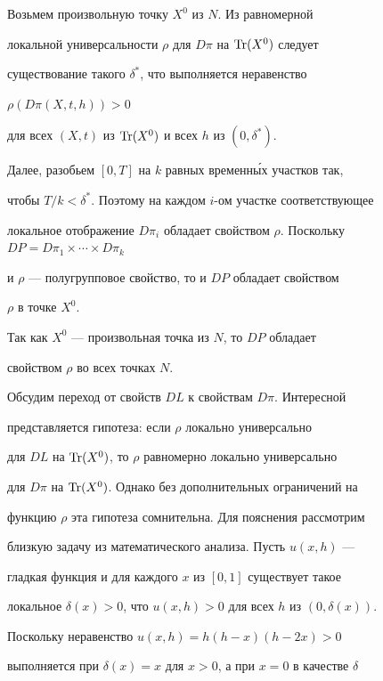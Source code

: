 \begin{pf} 


Возьмем произвольную точку $X^0$ из $N$. Из равномерной 


локальной универсальности $\rho$ для $D\pi$ на $\operatorname{Tr}(X^0)$ следует 


существование такого $\delta^*$, что выполняется неравенство 


$\rho(D\pi(X,t,h))>0$ 


для всех $(X,t)$ из $\operatorname{Tr}(X^0)$ и всех $h$ из $(0,\delta^*)$. 


 


Далее, разобьем $[0,T]$ на $k$ равных временн\'ых участков так, 


чтобы $T/k<\delta^*$. Поэтому на каждом $i$-ом участке соответствующее 


локальное отображение $D\pi_i$ обладает свойством $\rho$. Поскольку $D 


P=D\pi_1\times\dotsb\times D\pi_k$ 


и $\rho$ --- полугрупповое свойство, то и $D P$ обладает свойством 


$\rho$ в точке $X^0$. 


Так как $X^0$ --- произвольная точка из $N$, то $D P$ обладает 


свойством $\rho$ во всех точках $N$. 


\end{pf} 


 


Обсудим переход от свойств $D L$ к свойствам $D\pi$. Интересной 


представляется гипотеза: если $\rho$ локально универсально 


для $D L$ на $\operatorname{Tr}(X^0)$, то $\rho$ равномерно локально универсально 


для $D\pi$ на $\operatorname{Tr}(X^0)$. Однако без дополнительных ограничений на 


функцию $\rho$ эта гипотеза сомнительна. Для пояснения рассмотрим 


близкую задачу из математического анализа. Пусть $u(x,h)$ --- 


гладкая функция и для каждого $x$ из $[0,1]$ существует такое 


локальное $\delta(x)>0$, что $u(x,h)>0$ для всех $h$ из $(0,\delta(x))$. 


Поскольку неравенство $u(x,h)=h(h-x)(h-2x)>0$ 


выполняется при $\delta(x)=x$ для $x>0$, а при $x=0$ в качестве $\delta$ 


